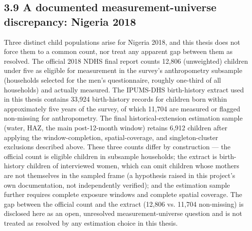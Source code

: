 \subsection*{3.9 A documented measurement-universe discrepancy: Nigeria 2018}

Three distinct child populations arise for Nigeria 2018, and this thesis does not force them to a common count, nor treat any apparent gap between them as resolved. The official 2018 NDHS final report counts 12,806 (unweighted) children under five as eligible for measurement in the survey's anthropometry subsample (households selected for the men's questionnaire, roughly one-third of all households) and actually measured. The IPUMS-DHS birth-history extract used in this thesis contains 33,924 birth-history records for children born within approximately five years of the survey, of which 11,704 are measured or flagged non-missing for anthropometry. The final historical-extension estimation sample (water, HAZ, the main post-12-month window) retains 6,912 children after applying the window-completion, spatial-coverage, and singleton-cluster exclusions described above. These three counts differ by construction --- the official count is eligible children in subsample households; the extract is birth-history children of interviewed women, which can omit children whose mothers are not themselves in the sampled frame (a hypothesis raised in this project's own documentation, not independently verified); and the estimation sample further requires complete exposure windows and complete spatial coverage. The gap between the official count and the extract (12,806 vs. 11,704 non-missing) is disclosed here as an open, unresolved measurement-universe question and is not treated as resolved by any estimation choice in this thesis.
